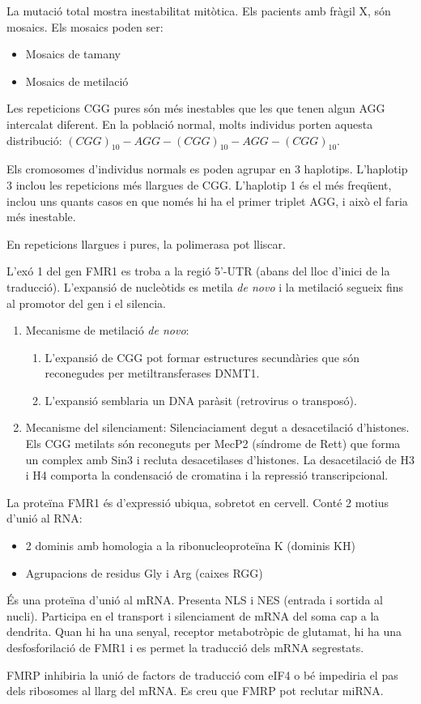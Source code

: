 La mutació total mostra inestabilitat mitòtica. Els pacients amb
fràgil X, són mosaics. Els mosaics poden ser:
\begin{itemize}
\item Mosaics de tamany
\item Mosaics de metilació
\end{itemize}

Les repeticions CGG pures són més inestables que les que tenen algun
AGG intercalat diferent. En la població normal, molts individus porten
aquesta distribució: $(CGG)_{10} - AGG- (CGG)_{10} - AGG- (CGG)_{10}$.

Els cromosomes d'individus normals es poden agrupar en 3
haplotips. L'haplotip 3 inclou les repeticions més llargues de
CGG. L'haplotip 1 és el més freqüent, inclou uns quants casos en que
només hi ha el primer triplet AGG, i això el faria més inestable.

En repeticions llargues i pures, la polimerasa pot lliscar.

L'exó 1 del gen FMR1 es troba a la regió 5'-UTR (abans del lloc
d'inici de la traducció). L'expansió de nucleòtids es metila
\textit{de novo} i la metilació segueix fins al promotor del gen i el
silencia.

\begin{enumerate}
\item Mecanisme de metilació \textit{de novo}:
  \begin{enumerate}
  \item  L'expansió de CGG pot
  formar estructures secundàries que són reconegudes per
  metiltransferases DNMT1.
  \item L'expansió semblaria un DNA paràsit
  (retrovirus o transposó).
  \end{enumerate}

\item Mecanisme del silenciament: Silenciaciament degut a
  desacetilació d'histones. Els CGG metilats són reconeguts per MecP2
  (síndrome de Rett) que forma un complex amb Sin3 i recluta
  desacetilases d'histones. La desacetilació de H3 i H4 comporta la
  condensació de cromatina i la repressió transcripcional. 
\end{enumerate}

La proteïna FMR1 és d'expressió ubiqua, sobretot en cervell. Conté 2
motius d'unió al RNA:
\begin{itemize}
\item 2 dominis amb homologia a la ribonucleoproteïna K (dominis KH)
\item Agrupacions de residus Gly i Arg (caixes RGG)
\end{itemize}

És una proteïna d'unió al mRNA. Presenta NLS i NES (entrada i sortida
al nucli). Participa en el transport i silenciament de mRNA del soma
cap a la dendrita. Quan  hi ha una senyal, receptor metabotròpic de
glutamat, hi ha una desfosforilació de FMR1 i es permet la traducció
dels mRNA segrestats.

FMRP inhibiria la unió de factors de traducció com eIF4 o bé impediria
el pas dels ribosomes al llarg del mRNA. Es creu que FMRP pot reclutar
miRNA.